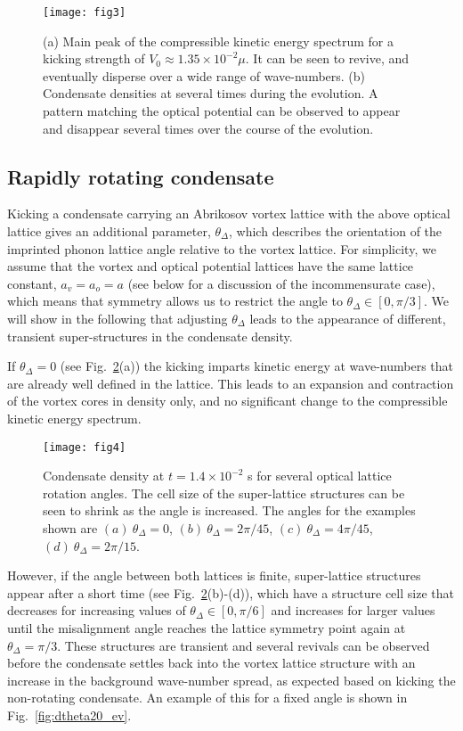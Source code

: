     		\begin{figure}[tb]
    			\texttt{[image: fig3]}
    			\caption{(a) Main peak of the compressible kinetic energy spectrum for a kicking strength of $V_0 \approx 1.35\times10^{-2}\mu$. It can be seen to revive, and eventually disperse over a wide range of wave-numbers.  (b) Condensate densities at several times during the evolution. A pattern matching the optical potential can be observed to appear and disappear several times over the course of the evolution.}
    			\label{fig:novtx_p5k}
    		\end{figure}

    	\subsection{Rapidly rotating condensate}

    Kicking a condensate carrying an Abrikosov vortex lattice with the above optical lattice gives an additional parameter, $\theta_\Delta$, which describes the orientation of the imprinted phonon lattice angle relative to the vortex lattice. For simplicity, we assume that the vortex and optical potential lattices have the same lattice constant, $a_v=a_o=a$ (see below for a discussion of the incommensurate case), which means that symmetry allows us to restrict the angle to $\theta_\Delta\in[0,\pi/3]$. We will show in the following that adjusting $\theta_\Delta$ leads to the appearance of different, transient super-structures in the condensate density.

    If $\theta_\Delta=0$ (see Fig.~\ref{fig:moire_density}(a)) the kicking imparts kinetic energy at wave-numbers that are already well defined in the lattice. This leads to an expansion and contraction of the vortex cores in density only, and no significant change to the compressible kinetic energy spectrum.

    	\begin{figure}[tb]
    			\texttt{[image: fig4]}
    			\caption{Condensate density at $t=1.4\times10^{-2}$ s for several optical lattice rotation angles. The cell size of the super-lattice structures can be seen to shrink as the angle is increased. The angles for the examples shown are $(a)~\theta_\Delta=0$, $(b)~\theta_\Delta=2\pi/45$, $(c)~\theta_\Delta=4\pi/45$, $(d)~\theta_\Delta=2\pi/15$. }
    			\label{fig:moire_density}
    		\end{figure}


    However, if the angle between both lattices is finite, super-lattice structures appear after a short time (see Fig.~\ref{fig:moire_density}(b)-(d)), which have a structure cell size that decreases for increasing values of $\theta_\Delta\in[0,\pi/6]$ and increases for larger values until the misalignment angle reaches the lattice symmetry point again at $\theta_\Delta=\pi/3$. These structures are transient and several revivals can be observed before the condensate settles back into the vortex lattice structure with an increase in the background wave-number spread, as expected based on kicking the non-rotating condensate. An example of this for a fixed angle is shown in Fig.~\ref{fig:dtheta20_ev}.

